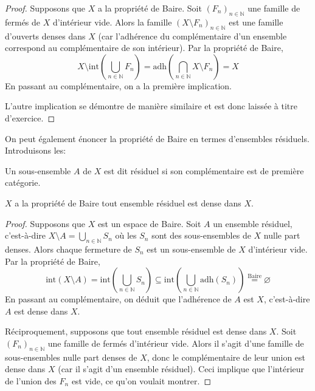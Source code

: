 \begin{proof}
  Supposons que $X$ a la propriété de Baire. Soit $(F_n)_{n\in\mathbb{N}}$ une
  famille de fermés de $X$ d'intérieur vide. Alors la famille
  $(X\setminus F_n)_{n\in\mathbb{N}}$ est une famille d'ouverts denses dans $X$
  (car l'adhérence du complémentaire d'un ensemble correspond au complémentaire
  de son intérieur). Par la propriété de Baire,
  $$X\setminus\mathrm{int} \left(\bigcup_{n\in\mathbb{N}} F_n \right)
  =\mathrm{adh}\left(\bigcap_{n\in\mathbb{N}} X\setminus F_n\right) = X$$
  En passant au complémentaire, on a la première implication.

  L'autre implication se démontre de manière similaire et est donc laissée
  à titre d'exercice.
\end{proof}

On peut également énoncer la propriété de Baire en termes d'ensembles
résiduels. Introduisons les:
\begin{df}
  Un sous-ensemble $A$ de $X$ est dit résiduel si son complémentaire
  est de première catégorie.
\end{df}

\begin{prop}
  $X$ a la propriété de Baire \ssi{}  tout
  ensemble résiduel est dense dans $X$.
\end{prop}

\begin{proof}
  Supposons que $X$ est un espace de Baire. Soit $A$ un ensemble résiduel,
  c'est-à-dire $X\setminus A = \bigcup_{n\in\mathbb N} S_n$ où les $S_n$ sont
  des sous-ensembles de $X$ nulle part denses. Alors chaque fermeture de $S_n$
  est un sous-ensemble de $X$ d'intérieur vide. Par la propriété de Baire,
  $$\mathrm{int}(X\setminus A) =
  \mathrm{int}\left(\bigcup_{n\in\mathbb N}S_n\right)\subseteq
  \mathrm{int}\left(\bigcup_{n\in\mathbb N}\mathrm{adh}(S_n)\right)
  \overset{\mbox{Baire}}{=} \varnothing$$
  En passant au complémentaire, on déduit que l'adhérence de $A$ est $X$,
  c'est-à-dire $A$ est dense dans $X$.

  Réciproquement, supposons que tout ensemble résiduel est dense dans $X$.
  Soit $(F_n)_{n\in\mathbb N}$ une famille de fermés d'intérieur vide. Alors
  il s'agit d'une famille de sous-ensembles nulle part denses de $X$, donc
  le complémentaire de leur union est dense dans $X$ (car il s'agit d'un
  ensemble résiduel). Ceci implique que l'intérieur de l'union des $F_n$
  est vide, ce qu'on voulait montrer.
\end{proof}


